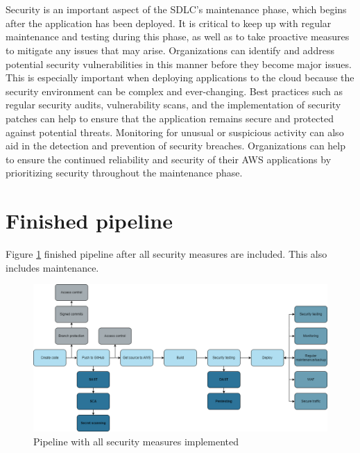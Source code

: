 \\~\\
Security is an important aspect of the SDLC's maintenance phase, which begins after the application has been deployed. It is critical to keep up with regular maintenance and testing during this phase, as well as to take proactive measures to mitigate any issues that may arise. Organizations can identify and address potential security vulnerabilities in this manner before they become major issues. This is especially important when deploying applications to the cloud because the security environment can be complex and ever-changing. Best practices such as regular security audits, vulnerability scans, and the implementation of security patches can help to ensure that the application remains secure and protected against potential threats. Monitoring for unusual or suspicious activity can also aid in the detection and prevention of security breaches. Organizations can help to ensure the continued reliability and security of their AWS applications by prioritizing security throughout the maintenance phase.

\section{Finished pipeline}
Figure \ref{fig: Pipeline with all security measures implemented} finished pipeline after all security measures are included. This also includes maintenance.  

\vspace{2mm}
\begin{figure}[H]
    \centering
    \includegraphics[width=0.8\columnwidth]{Images/pipeline9.png}
    \caption{Pipeline with all security measures implemented}
    \label{fig: Pipeline with all security measures implemented}
\end{figure}



